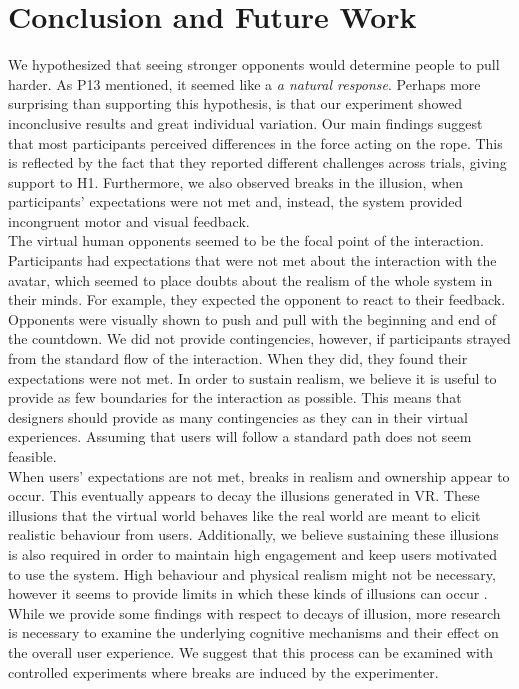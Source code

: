 \section{Conclusion and Future Work}

We hypothesized that seeing stronger opponents would determine people to pull harder. As P13 mentioned, it seemed like a \textit{a natural response}. Perhaps more surprising than supporting this hypothesis, is that our experiment showed inconclusive results and great individual variation. Our main findings suggest that most participants perceived differences in the force acting on the rope. This is reflected by the fact that they reported different challenges across trials, giving support to H1. Furthermore, we also observed breaks in the illusion, when participants' expectations were not met and, instead, the system provided incongruent motor and visual feedback.
\\
The virtual human opponents seemed to be the focal point of the interaction. Participants had expectations that were not met about the interaction with the avatar, which seemed to place doubts about the realism of the whole system in their minds. For example, they expected the opponent to react to their feedback. Opponents were visually shown to push and pull with the beginning and end of the countdown. We did not provide contingencies, however, if participants strayed from the standard flow of the interaction. When they did, they found their expectations were not met. In order to sustain realism, we believe it is useful to provide as few boundaries for the interaction as possible. This means that designers should provide as many contingencies as they can in their virtual experiences. Assuming that users will follow a standard path does not seem feasible.
 \\
When users' expectations are not met, breaks in realism and ownership appear to occur. This eventually appears to decay the illusions generated in VR. These illusions that the virtual world behaves like the real world are meant to elicit realistic behaviour from users. Additionally, we believe sustaining these illusions is also required in order to maintain high engagement and keep users motivated to use the system. High behaviour and physical realism might not be necessary, however it seems to provide limits in which these kinds of illusions can occur \cite{slater2009place}. While we provide some findings with respect to decays of illusion, more research is necessary to examine the underlying cognitive mechanisms and their effect on the overall user experience. We suggest that this process can be examined with controlled experiments where breaks are induced by the experimenter. 
